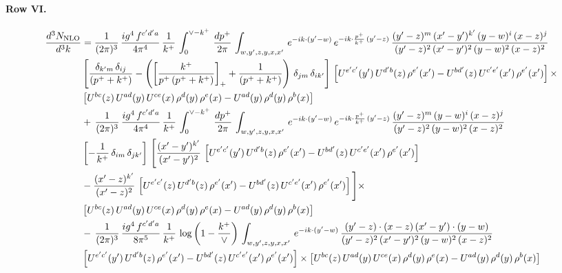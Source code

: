 \documentclass[10pt]{article}
\numberwithin{equation}{section}
\begin{document}
\paragraph{Row VI.}
\begin{align}
    \frac{d^{3}N_{\rm NLO}}{d^{3}k} & =  \frac{1}{(2\pi)^{3}}\, \frac{ig^{4}\,f^{c'd'a}}{4\pi^{4}}\, \frac{1}{k^{+}}\,\int_{0}^{\vee-k^{+}}\, \frac{dp^{+}}{2\pi}\, \int_{w,y',z,y,x,x'}\, e^{-ik\cdot (y'-w)}\, e^{-ik\cdot \frac{p^{+}}{k^{+}}\,(y'-z)}\,\frac{(y'-z)^{m}\,(x'-y')^{k'}\,(y-w)^{i}\,(x-z)^{j}}{(y'-z)^{2}\,(x'-y')^{2}\,(y-w)^{2}\,(x-z)^{2}}\notag \\ & \left[\frac{\delta_{k'm}\,\delta_{ij}}{(p^{+}+k^{+})}-\left(\left[\frac{k^{+}}{p^{+}\,(p^{+}+k^{+})}\right]_{+}+\frac{1}{(p^{+}+k^{+})}\right)\,\delta_{jm}\,\delta_{ik'}\right]\, \left[U^{e'c'}(y')\,U^{d'b}(z)\,\rho^{e'}(x')-U^{bd'}(z)\,U^{c'e'}(x')\,\rho^{e'}(x')\right]\times\notag \\ &  \left[U^{bc}(z)\,U^{ad}(y)\,U^{ce}(x)\,\rho^{d}(y)\,\rho^{e}(x)-U^{ad}(y)\,\rho^{d}(y)\,\rho^{b}(x)\right] \notag \\ &  +\,\frac{1}{(2\pi)^{3}}\, \frac{ig^{4}\,f^{c'd'a}}{4\pi^{4}}\, \frac{1}{k^{+}}\,\int_{0}^{\vee-k^{+}}\, \frac{dp^{+}}{2\pi}\, \int_{w,y',z,y,x,x'}\, e^{-ik\cdot (y'-w)}\, e^{-ik\cdot \frac{p^{+}}{k^{+}}\,(y'-z)}\,\frac{(y'-z)^{m}\,(y-w)^{i}\,(x-z)^{j}}{(y'-z)^{2}\,(y-w)^{2}\,(x-z)^{2}}\notag \\ &  \left[-\frac{1}{k^{+}}\, \delta_{im}\, \delta_{jk'}\right]\, \Bigg[\frac{(x'-y')^{k'}}{(x'-y')^{2}}\,\left[U^{e'c'}(y')\,U^{d'b}(z)\,\rho^{e'}(x')-U^{bd'}(z)\,U^{c'e'}(x')\,\rho^{e'}(x')\right]\notag \\ & -\frac{(x'-z)^{k'}}{(x'-z)^{2}}\,\left[U^{e'c'}(z)\,U^{d'b}(z)\,\rho^{e'}(x')-U^{bd'}(z)\,U^{c'e'}(x')\,\rho^{e'}(x')\right]\Bigg]\times\notag \\ &    \left[U^{bc}(z)\,U^{ad}(y)\,U^{ce}(x)\,\rho^{d}(y)\,\rho^{e}(x)-U^{ad}(y)\,\rho^{d}(y)\,\rho^{b}(x)\right] \notag \\
&  -\,\frac{1}{(2\pi)^{3}}\, \frac{ig^{4}\,f^{c'd'a}}{8\pi^{5}}\, \frac{1}{k^{+}}\,\log{\left(1-\frac{k^{+}}{\vee}\right)}\, \int_{w,y',z,y,x,x'}\, e^{-ik\cdot (y'-w)}\,\frac{(y'-z)\cdot (x-z)\,(x'-y')\cdot (y-w)}{(y'-z)^{2}\,(x'-y')^{2}\,(y-w)^{2}\,(x-z)^{2}}\notag \\ & \left[U^{e'c'}(y')\,U^{d'b}(z)\,\rho^{e'}(x')-U^{bd'}(z)\,U^{c'e'}(x')\,\rho^{e'}(x')\right]\times  \left[U^{bc}(z)\,U^{ad}(y)\,U^{ce}(x)\,\rho^{d}(y)\,\rho^{e}(x)-U^{ad}(y)\,\rho^{d}(y)\,\rho^{b}(x)\right]
\end{align}
\end{document}
